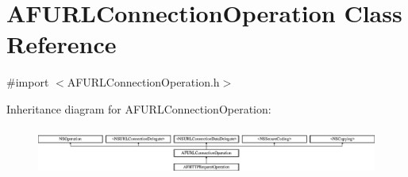 \hypertarget{interface_a_f_u_r_l_connection_operation}{}\section{A\+F\+U\+R\+L\+Connection\+Operation Class Reference}
\label{interface_a_f_u_r_l_connection_operation}


{\ttfamily \#import $<$A\+F\+U\+R\+L\+Connection\+Operation.\+h$>$}

Inheritance diagram for A\+F\+U\+R\+L\+Connection\+Operation\+:\begin{figure}[H]
\begin{center}
\leavevmode
\includegraphics[height=1.570093cm]{interface_a_f_u_r_l_connection_operation}
\end{center}
\end{figure}
